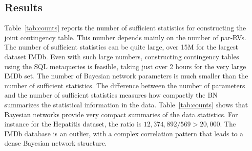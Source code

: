 \subsection{Results}
Table~\ref{tab:counts} reports the number of sufficient statistics for constructing the joint contingency table. This number depends mainly on the number of par-RVs. The number of sufficient statistics can be quite large, over 15M for the largest dataset IMDb. 
Even with such large numbers, constructing contingency tables using the SQL metaqueries is feasible, taking just over 2 hours for the very large IMDb set. 
The number of Bayesian network parameters is much smaller than the number of sufficient statistics.
The difference between the number of parameters and the number of sufficient statistics measures how compactly the BN summarizes the statistical information in the data. %
Table~\ref{tab:counts} shows that Bayesian networks provide very compact summaries of the data statistics. For instance for the Hepatitis dataset, the ratio is  $12,374,892/569 > 20,000$. The IMDb database is an outlier, with a complex correlation pattern that leads to a dense Bayesian network structure.

